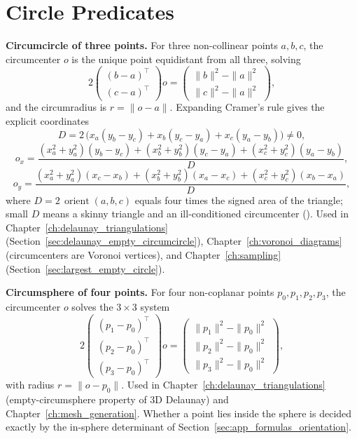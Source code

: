 
\section{Circle Predicates}
\label{sec:app_formulas_circles}

\medskip\noindent\textbf{Circumcircle of three points.}
For three non-collinear points $a, b, c$, the circumcenter $o$ is the
unique point equidistant from all three, solving
\[
  2 \begin{pmatrix} (b - a)^\top \\ (c - a)^\top \end{pmatrix} o
  = \begin{pmatrix} \|b\|^2 - \|a\|^2 \\ \|c\|^2 - \|a\|^2 \end{pmatrix},
\]
and the circumradius is $r = \|o - a\|$. Expanding Cramer's rule gives the
explicit coordinates
\[
  D = 2\,\bigl(x_a(y_b - y_c) + x_b(y_c - y_a) + x_c(y_a - y_b)\bigr) \neq 0,
\]
\[
  o_x = \frac{(x_a^2 + y_a^2)(y_b - y_c) + (x_b^2 + y_b^2)(y_c - y_a) + (x_c^2 + y_c^2)(y_a - y_b)}{D},
\]
\[
  o_y = \frac{(x_a^2 + y_a^2)(x_c - x_b) + (x_b^2 + y_b^2)(x_a - x_c) + (x_c^2 + y_c^2)(x_b - x_a)}{D},
\]
where $D = 2\,\operatorname{orient}(a,b,c)$ equals four times the signed
area of the triangle; small $D$ means a skinny triangle and an
ill-conditioned circumcenter
(\cite{weisstein2004}). Used in Chapter~\ref{ch:delaunay_triangulations}
(Section~\ref{sec:delaunay_empty_circumcircle}), Chapter~\ref{ch:voronoi_diagrams}
(circumcenters are Voronoi vertices), and Chapter~\ref{ch:sampling}
(Section~\ref{sec:largest_empty_circle}).

\medskip\noindent\textbf{Circumsphere of four points.}
For four non-coplanar points $p_0, p_1, p_2, p_3$, the circumcenter $o$
solves the $3\times 3$ system
\[
  2 \begin{pmatrix} (p_1 - p_0)^\top \\ (p_2 - p_0)^\top \\ (p_3 - p_0)^\top \end{pmatrix} o
  = \begin{pmatrix} \|p_1\|^2 - \|p_0\|^2 \\
      \|p_2\|^2 - \|p_0\|^2 \\
      \|p_3\|^2 - \|p_0\|^2 \end{pmatrix},
\]
with radius $r = \|o - p_0\|$. Used in Chapter~\ref{ch:delaunay_triangulations}
(empty-circumsphere property of 3D Delaunay) and
Chapter~\ref{ch:mesh_generation}. Whether a point lies inside the sphere is
decided exactly by the in-sphere determinant of
Section~\ref{sec:app_formulas_orientation}.

